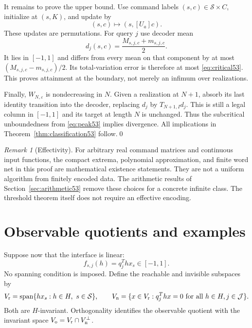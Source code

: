 \documentclass[11pt]{amsart}
\numberwithin{equation}{section}
\theoremstyle{definition}
\theoremstyle{remark}
\newtheorem{remark}[theorem]{Remark}
\DeclareMathOperator{\spanop}{span}
\begin{document}
It remains to prove the upper bound. Use command labels $(s,c)\in\mathcal S\times C$, initialize at $(s,K)$, and update by
\[
 (s,c)\longmapsto(s,[U_a]c).
\]
These updates are permutations. For query $j$ use decoder mean
\begin{equation}\label{eq:midpoint53}
             d_j(s,c)=\frac{M_{s,j,c}+m_{s,j,c}}2.
\end{equation}
It lies in $[-1,1]$ and differs from every mean on that component by at most $(M_{s,j,c}-m_{s,j,c})/2$. Its total-variation error is therefore at most \eqref{eq:critical53}. This proves attainment at the boundary, not merely an infimum over realizations.

Finally, $W_{N,\varepsilon}$ is nondecreasing in $N$. Given a realization at $N+1$, absorb its last identity transition into the decoder, replacing $d_j$ by $T_{N+1,I}d_j$. This is still a legal column in $[-1,1]$ and its target at length $N$ is unchanged. Thus the subcritical unboundedness from \eqref{eq:peak53} implies divergence. All implications in Theorem~\ref{thm:classification53} follow.\qed

\begin{remark}[Effectivity]\label{rem:effective53}
For arbitrary real command matrices and continuous input functions, the compact extrema, polynomial approximation, and finite word net in this proof are mathematical existence statements. They are not a uniform algorithm from finitely encoded data. The arithmetic results of Section~\ref{sec:arithmetic53} remove these choices for a concrete infinite class. The threshold theorem itself does not require an effective encoding.
\end{remark}

\section{Observable quotients and examples}\label{sec:observable53}
Suppose now that the interface is linear:
\begin{equation}\label{eq:linear53}
 f_{s,j}(h)=q_j^Thx_s\in[-1,1].
\end{equation}
No spanning condition is imposed. Define the reachable and invisible subspaces by
\[
 V_{\rm r}=\spanop\{hx_s:h\in H,\ s\in\mathcal S\},\qquad
 V_{\rm n}=\{x\in V_{\rm r}:q_j^Thx=0\text{ for all }h\in H,j\in\mathcal J\}.
\]
Both are $H$-invariant. Orthogonality identifies the observable quotient with the invariant space $V_{\rm o}=V_{\rm r}\cap V_{\rm n}^{\perp}$.
\end{document}
